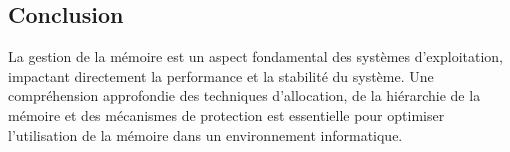 \subsection{Conclusion}
La gestion de la mémoire est un aspect fondamental des systèmes d'exploitation, impactant directement la performance et la stabilité du système. 
Une compréhension approfondie des techniques d'allocation, de la hiérarchie de la mémoire et des mécanismes de protection est essentielle pour optimiser l'utilisation de la mémoire dans un environnement informatique.

